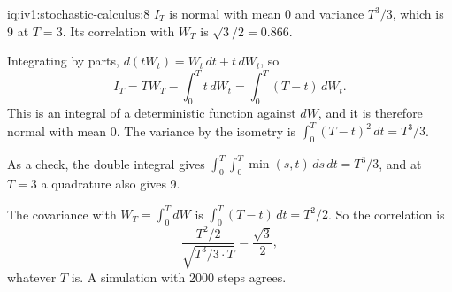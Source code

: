 \enlargethispage{-1\baselineskip}%
\begin{solution}{iq:iv1:stochastic-calculus:8}
$I_T$ is normal with mean 0 and variance $T^3/3$, which is 9 at $T = 3$. Its correlation with $W_T$ is $\sqrt{3}/2 = 0.866$.

Integrating by parts, $d(tW_t) = W_t\,dt + t\,dW_t$, so
\[
I_T = TW_T - \int_0^Tt\,dW_t = \int_0^T(T - t)\,dW_t.
\]
This is an integral of a deterministic function against $dW$, and it is therefore normal with mean 0. The variance by the isometry is $\int_0^T(T - t)^2\,dt = T^3/3$.

As a check, the double integral gives $\int_0^T\int_0^T\min(s, t)\,ds\,dt = T^3/3$, and at $T = 3$ a quadrature also gives 9.

The covariance with $W_T = \int_0^T dW$ is $\int_0^T(T - t)\,dt = T^2/2$. So the correlation is
\[
\frac{T^2/2}{\sqrt{T^3/3 \cdot T}} = \frac{\sqrt{3}}{2},
\]
whatever $T$ is. A simulation with 2000 steps agrees.



\end{solution}

